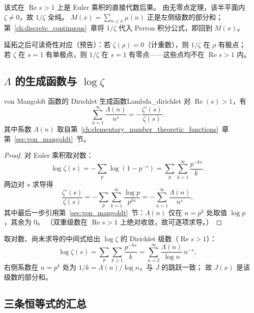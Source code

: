 该式在 $\operatorname{Re}s>1$ 上是 Euler 乘积的直接代数后果。
由无零点定理，该半平面内 $\zeta\neq 0$，故 $1/\zeta$ 全纯。
$M(x)=\sum_{n\le x}\mu(n)$ 正是左侧级数的部分和；
第~\ref{ch:discrete_continuous}~章将 $1/\zeta$ 代入 Perron 积分公式，即回到 $M(x)$。

延拓之后可读奇性对应（预告）：若 $\zeta(\rho)=0$（计重数），则 $1/\zeta$ 在 $\rho$ 有极点；
若 $\zeta$ 在 $s=1$ 有单极点，则 $1/\zeta$ 在 $s=1$ 有零点——这些点均不在 $\operatorname{Re}s>1$ 内。

\subsection{\texorpdfstring{$\Lambda$}{Lambda} 的生成函数与 \texorpdfstring{$\log\zeta$}{log zeta}}

\begin{theorem}{von Mangoldt 函数的 Dirichlet 生成函数}{Lambda_dirichlet}
对 $\operatorname{Re}(s) > 1$，有
\begin{equation}
\sum_{n=1}^{\infty} \frac{\Lambda(n)}{n^{s}} = -\frac{\zeta'(s)}{\zeta(s)}.
\label{eq:Lambda_dirichlet}
\end{equation}
其中系数 $\Lambda(n)$ 取自第~\ref{ch:elementary_number_theoretic_functions}~章第~\ref{sec:von_mangoldt}~节。
\end{theorem}

\begin{proof}
对 Euler 乘积取对数：
\[
\log\zeta(s) = -\sum_{p} \log(1-p^{-s}) = \sum_{p} \sum_{k=1}^{\infty} \frac{p^{-ks}}{k}.
\]
两边对 $s$ 求导得
\[
\frac{\zeta'(s)}{\zeta(s)}
= -\sum_{p} \sum_{k=1}^{\infty} \frac{\log p}{p^{ks}}
= -\sum_{n=1}^{\infty} \frac{\Lambda(n)}{n^{s}},
\]
其中最后一步引用第~\ref{sec:von_mangoldt}~节：$\Lambda(n)$ 仅在 $n=p^k$ 处取值 $\log p$，其余为 $0$。
（双重级数在 $\operatorname{Re}s>1$ 上绝对收敛，故可逐项求导。）
\end{proof}

取对数、尚未求导的中间式给出 $\log\zeta$ 的 Dirichlet 级数（$\operatorname{Re}s>1$）：
\begin{equation}
\log\zeta(s)
= \sum_{p}\sum_{k\ge 1}\frac{p^{-ks}}{k}
= \sum_{n=2}^{\infty}\frac{\Lambda(n)}{\log n}\,n^{-s},
\label{eq:log_zeta_dirichlet}
\end{equation}
右侧系数在 $n=p^k$ 处为 $1/k=\Lambda(n)/\log n$，与 $J$ 的跳跃一致；
故 $J(x)$ 是该级数的部分和。

\subsection{三条恒等式的汇总}

